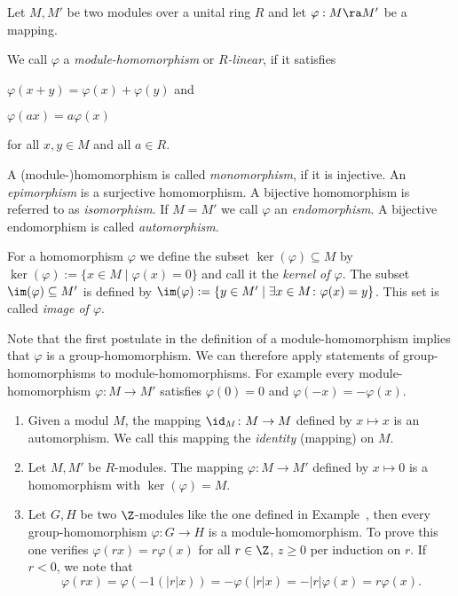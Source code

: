  \begin{defin}
Let $M,M'$ be two modules over a unital ring $R$ and let $\varphi : M \ra M'$ be a mapping. 
\begin{exlist}
\item We call $\varphi$ a \emph{module-homomorphism} or \textit{$R$-linear}, if it satisfies
\begin{exlist}
\item $\varphi(x+y)=\varphi(x)+\varphi(y)$ and
\item $\varphi(ax)=a\varphi(x)$
\end{exlist}
for all $x,y \in M$ and all $a \in R$.
\item A (module-)homomorphism is called \textit{monomorphism}, if it is injective. An \emph{epimorphism} is a surjective homomorphism. A bijective homomorphism is referred to as \textit{isomorphism}. If $M=M'$ we call $\varphi$ an \textit{endomorphism}. A bijective endomorphism is called \textit{automorphism}.
\item For a homomorphism $\varphi$ we define the subset $\ker(\varphi)\subseteq M$ by $\ker(\varphi):=\lbrace x\in M \mid \varphi(x)=0\rbrace$ and call it the \emph{kernel of $\varphi$}. The subset $\im(\varphi)\subseteq M'$ is defined by $\im(\varphi):=\lbrace y\in M' \mid \exists x\in M\colon \varphi(x)=y\rbrace$. This set is called \emph{image of $\varphi$}.
\end{exlist}
\end{defin}

Note that the first postulate in the definition of a module-homomorphism implies that $\varphi$ is a group-homomorphism. We can therefore apply statements of group-homomorphisms to module-homomorphisms. For example every module-homomorphism $\varphi\colon M\rightarrow M'$ satisfies $\varphi(0)=0$ and $\varphi(-x)=-\varphi(x)$.

\begin{exam}
\begin{enumerate}
\item Given a modul $M$, the mapping $\id_M\colon M \rightarrow M$ defined by $x\mapsto x$ is an automorphism. We  call this mapping the \emph{identity} (mapping) on $M$.
\item Let $M, M'$ be $R$-modules. The mapping $\varphi\colon M\rightarrow M'$ defined by $x\mapsto 0$ is a homomorphism with $\ker(\varphi)=M$. 
\item Let $G, H$ be two $\Z$-modules like the one defined in Example~, then every group-homomorphism $\varphi\colon G\rightarrow H$ is a module-homomorphism. To prove this one verifies $\varphi(rx)=r\varphi(x)$ for all $r\in\Z$, $z\geq 0$ per induction on $r$. If $r<0$, we note that 
\begin{equation*}
\varphi(rx)=\varphi(-1(\lvert r\rvert x))=-\varphi(\lvert r\rvert x)=-\lvert r\rvert\varphi(x)=r\varphi(x).
\end{equation*}
\end{enumerate}
\end{exam}

